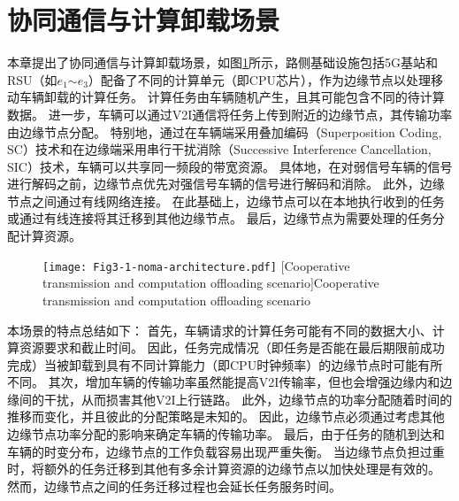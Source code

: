\section[\hspace{-2pt}协同通信与计算卸载场景]{{ \hspace{-8pt}协同通信与计算卸载场景}}\label{section 3-2}

本章提出了协同通信与计算卸载场景，如图\ref{fig 3-1}所示，路侧基础设施包括5G基站和RSU（如$e_1$$\sim$$e_3$）配备了不同的计算单元（即CPU芯片），作为边缘节点以处理移动车辆卸载的计算任务。
计算任务由车辆随机产生，且其可能包含不同的待计算数据。
进一步，车辆可以通过V2I通信将任务上传到附近的边缘节点，其传输功率由边缘节点分配。
特别地，通过在车辆端采用叠加编码（Superposition Coding, SC）技术和在边缘端采用串行干扰消除（Successive Interference Cancellation, SIC）\cite{khan2021noma}技术，车辆可以共享同一频段的带宽资源。
具体地，在对弱信号车辆的信号进行解码之前，边缘节点优先对强信号车辆的信号进行解码和消除。
此外，边缘节点之间通过有线网络连接。
在此基础上，边缘节点可以在本地执行收到的任务或通过有线连接将其迁移到其他边缘节点。
最后，边缘节点为需要处理的任务分配计算资源。

\begin{figure}[h]
\centering
  \texttt{[image: Fig3-1-noma-architecture.pdf]}
  [Cooperative transmission and computation offloading scenario]{Cooperative transmission and computation offloading scenario}
  \label{fig 3-1}
\end{figure} 

本场景的特点总结如下：
首先，车辆请求的计算任务可能有不同的数据大小、计算资源要求和截止时间。
因此，任务完成情况（即任务是否能在最后期限前成功完成）当被卸载到具有不同计算能力（即CPU时钟频率）的边缘节点时可能有所不同。
其次，增加车辆的传输功率虽然能提高V2I传输率，但也会增强边缘内和边缘间的干扰，从而损害其他V2I上行链路。
此外，边缘节点的功率分配随着时间的推移而变化，并且彼此的分配策略是未知的。
因此，边缘节点必须通过考虑其他边缘节点功率分配的影响来确定车辆的传输功率。
最后，由于任务的随机到达和车辆的时变分布，边缘节点的工作负载容易出现严重失衡。
当边缘节点负担过重时，将额外的任务迁移到其他有多余计算资源的边缘节点以加快处理是有效的。
然而，边缘节点之间的任务迁移过程也会延长任务服务时间。

